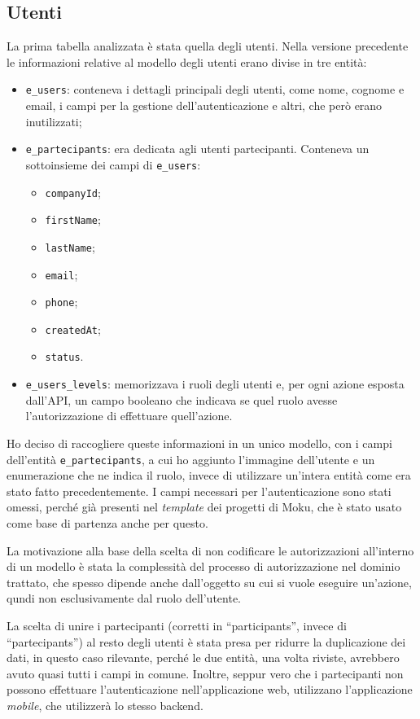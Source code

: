 \subsection{Utenti}
La prima tabella analizzata è stata quella degli utenti. Nella versione precedente le informazioni relative al modello degli utenti erano divise in tre entità:
\begin{itemize}
	\item \verb|e_users|: conteneva i dettagli principali degli utenti, come nome, cognome e email, i campi per la gestione dell'autenticazione e altri, che però erano inutilizzati;
	\item \verb|e_partecipants|: era dedicata agli utenti partecipanti. Conteneva un sottoinsieme dei campi di \verb|e_users|:
	\begin{itemize}
		\item \verb|companyId|;
		\item \verb|firstName|;
		\item \verb|lastName|;
		\item \verb|email|;
		\item \verb|phone|;
		\item \verb|createdAt|;
		\item \verb|status|.
	\end{itemize}
	\item \verb|e_users_levels|: memorizzava i ruoli degli utenti e, per ogni azione esposta dall'API, un campo booleano che indicava se quel ruolo avesse l'autorizzazione di effettuare quell'azione.
\end{itemize}
Ho deciso di raccogliere queste informazioni in un unico modello, con i campi dell'entità \verb|e_partecipants|, a cui ho aggiunto l'immagine dell'utente e un enumerazione che ne indica il ruolo, invece di utilizzare un'intera entità come era stato fatto precedentemente. I campi necessari per l'autenticazione sono stati omessi, perché già presenti nel \emph{template} dei progetti di Moku, che è stato usato come base di partenza anche per questo.

La motivazione alla base della scelta di non codificare le autorizzazioni all'interno di un modello è stata la complessità del processo di autorizzazione nel dominio trattato, che spesso dipende anche dall'oggetto su cui si vuole eseguire un'azione, qundi non esclusivamente dal ruolo dell'utente.

La scelta di unire i partecipanti (corretti in ``participants'', invece di ``partecipants'') al resto degli utenti è stata presa per ridurre la duplicazione dei dati, in questo caso rilevante, perché le due entità, una volta riviste, avrebbero avuto quasi tutti i campi in comune. Inoltre, seppur vero che i partecipanti non possono effettuare l'autenticazione nell'applicazione web, utilizzano l'applicazione \emph{mobile}, che utilizzerà lo stesso backend.


